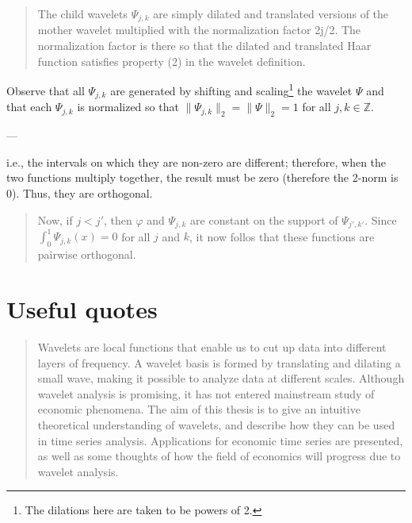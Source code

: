 \documentclass[2pt]{amsart}
\author{Jason Ngo}
\theoremstyle{theorem} %
\theoremstyle{definition}
\theoremstyle{example}
\theoremstyle{remark}
\numberwithin{equation}{section}
\newcommand{\Z}{\mathbb{Z}}
\begin{document}
	
\begin{quote}
	The child wavelets $ \varPsi_{j,k} $ are simply dilated and translated versions of the mother wavelet multiplied with the normalization factor 2j/2. The normalization factor is there so that the dilated and translated Haar function satisfies property (2) in the wavelet	definition.
\end{quote}

Observe that all $ \varPsi_{j,k} $ are generated by shifting and scaling\footnote{The dilations here are taken to be powers of 2.} the wavelet $ \varPsi $ and that each $ \varPsi_{j,k} $ is normalized so that $ \| \varPsi_{j,k}\|_2 = \|\varPsi\|_2 = 1 $ for all $ j,k \in \Z $.

---

i.e., the intervals on which they are non-zero are different; therefore, when the two functions multiply together, the result must be zero (therefore the 2-norm is 0). Thus, they are orthogonal. 
\begin{quote}
	Now, if $ j < j' $, then $ \varphi $ and $ \varPsi_{j,k} $ are constant on the support of $ \varPsi_{j',k'} $. Since $ \int_0^1 \varPsi_{j,k}(x) = 0 $ for all $ j $ and $ k $, it now follos that these functions are pairwise orthogonal.
\end{quote}

\section{Useful quotes}
\begin{quote}
	Wavelets are local functions that enable us to cut up data into different layers of frequency. A wavelet basis is formed by translating and dilating a small wave, making it
	possible to analyze data at different scales. Although wavelet analysis is promising, it
	has not entered mainstream study of economic phenomena. The aim of this thesis is to
	give an intuitive theoretical understanding of wavelets, and describe how they can be
	used in time series analysis. Applications for economic time series are presented, as well
	as some thoughts of how the field of economics will progress due to wavelet analysis.
\end{quote}
\end{document}
